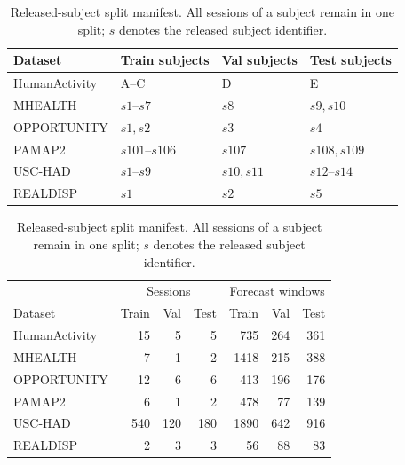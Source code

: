 \begin{table}[H]
\centering
\caption{Released-subject split manifest. All sessions of a subject remain in
one split; $s$ denotes the released subject identifier.}
\label{tab:app-subject-manifest}
\setlength{\tabcolsep}{4pt}
\begin{tabular}{@{}llll@{}}
\toprule
Dataset & Train subjects & Val subjects & Test subjects \\
\midrule
HumanActivity & A--C & D & E \\
MHEALTH & $s1$--$s7$ & $s8$ & $s9,s10$ \\
OPPORTUNITY & $s1,s2$ & $s3$ & $s4$ \\
PAMAP2 & $s101$--$s106$ & $s107$ & $s108,s109$ \\
USC-HAD & $s1$--$s9$ & $s10,s11$ & $s12$--$s14$ \\
REALDISP & $s1$ & $s2$ & $s5$ \\
\bottomrule
\end{tabular}

\vspace{4pt}
\begin{tabular}{@{}lrrrrrr@{}}
\toprule
& \multicolumn{3}{c}{Sessions} & \multicolumn{3}{c}{Forecast windows} \\
Dataset & Train & Val & Test & Train & Val & Test \\
\midrule
HumanActivity & 15 & 5 & 5 & 735 & 264 & 361 \\
MHEALTH & 7 & 1 & 2 & 1418 & 215 & 388 \\
OPPORTUNITY & 12 & 6 & 6 & 413 & 196 & 176 \\
PAMAP2 & 6 & 1 & 2 & 478 & 77 & 139 \\
USC-HAD & 540 & 120 & 180 & 1890 & 642 & 916 \\
REALDISP & 2 & 3 & 3 & 56 & 88 & 83 \\
\bottomrule
\end{tabular}
\end{table}
